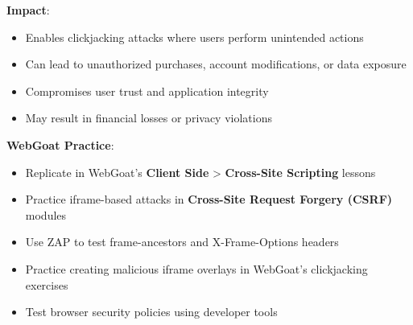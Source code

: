 \documentclass[]{UCD_CS_FYP_Report}
\begin{document}
\textbf{Impact}:
\begin{itemize}
    \item Enables clickjacking attacks where users perform unintended actions
    \item Can lead to unauthorized purchases, account modifications, or data exposure
    \item Compromises user trust and application integrity
    \item May result in financial losses or privacy violations
\end{itemize}

\textbf{WebGoat Practice}:
\begin{itemize}
    \item Replicate in WebGoat's \textbf{Client Side} > \textbf{Cross-Site Scripting} lessons
    \item Practice iframe-based attacks in \textbf{Cross-Site Request Forgery (CSRF)} modules
    \item Use ZAP to test frame-ancestors and X-Frame-Options headers
    \item Practice creating malicious iframe overlays in WebGoat's clickjacking exercises
    \item Test browser security policies using developer tools
\end{itemize}
\end{document}
